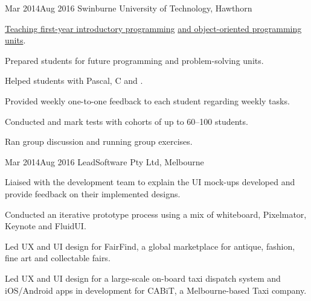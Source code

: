 {Mar 2014}{Aug 2016}
{Swinburne University of Technology, Hawthorn}
{\item \href{http://www.swinburne.edu.au/study/courses/units/Introduction-to-Programming-COS10009/local}{Teaching first-year introductory programming} \href{http://www.swinburne.edu.au/study/courses/units/Object-Oriented-Programming-COS70006/local}{and object-oriented programming units}.
  \item Prepared students for future programming and problem-solving units.
  \item Helped students with Pascal, C and \Csh{}.
}
{
  \item Provided weekly one-to-one feedback to each student regarding weekly tasks.
  \item Conducted and mark tests with cohorts of up to 60--100 students.
  \item Ran group discussion and running group exercises.
}

{Mar 2014}{Aug 2016}
{LeadSoftware Pty Ltd, Melbourne}
{
  \item Liaised with the development team to explain the UI mock-ups developed and provide feedback on their implemented designs.
  \item Conducted an iterative prototype process using a mix of whiteboard, Pixelmator, Keynote and FluidUI.
}
{
  \item Led UX and UI design for FairFind, a global marketplace for antique, fashion, fine art and collectable fairs.
  \item Led UX and UI design for a large-scale on-board taxi dispatch system and iOS/Android apps in development for CABiT, a Melbourne-based Taxi company.
}

\vspace{-2\bigskipamount}
